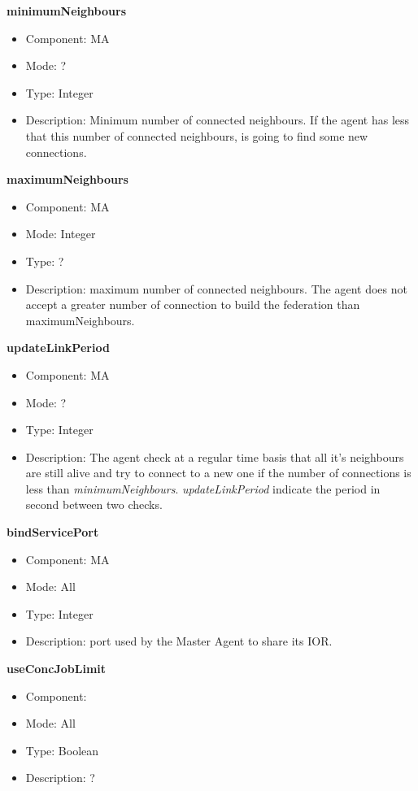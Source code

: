 \begin{description}
\item{\bf{minimumNeighbours}}
  \begin{itemize}
  \item Component: MA
  \item Mode: ?
  \item Type: Integer
  \item Description: Minimum number of connected neighbours. If the
    agent has less that this number of connected neighbours, is going to
    find some new connections. 
  \end{itemize}

\item{\bf{maximumNeighbours}}
  \begin{itemize}
  \item Component: MA
  \item Mode: Integer 
  \item Type: ?
  \item Description: maximum number of connected neighbours. The agent
    does not accept a greater number of connection to build the federation
    than maximumNeighbours.
  \end{itemize}

\item{\bf{updateLinkPeriod}}
  \begin{itemize}
  \item Component: MA
  \item Mode: ?
  \item Type: Integer
  \item Description: The agent check at a regular time basis that all
    it's neighbours are still alive and try to connect to a new one if the
    number of connections is less than
    \emph{minimumNeighbours}. \emph{updateLinkPeriod} indicate the period
    in second between two checks.
  \end{itemize}

\item{\bf{bindServicePort}}
  \begin{itemize}
  \item Component: MA
  \item Mode: All
  \item Type: Integer
  \item Description: port used by the Master Agent to share its IOR.
  \end{itemize}

\item{\bf{useConcJobLimit}}
  \begin{itemize}
  \item Component: \sed
  \item Mode: All
  \item Type: Boolean
  \item Description: ?
  \end{itemize}


\end{description}
